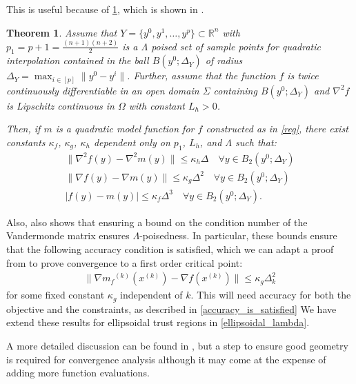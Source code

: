 \documentclass{article}
\newtheorem{theorem}{Theorem}[section]
\theoremstyle{case}
\numberwithin{theorem}{subsection}
\newcommand{\dk}{\Delta_k}
\newcommand{\gradf}{\nabla f}
\newcommand{\mfk}{{{m}_f}^{(k)}}
\newcommand{\Rn}{\mathbb R^n}
\newcommand{\xk}{x^{(k)}}
\begin{document}
This is useful because of \cref{quadratic_errors}, which is shown in \cite{introduction_book}.

\begin{theorem}
\label{quadratic_errors}
Assume that $Y = \{y^0, y^1, \ldots, y^p\} \subset \Rn$ with $p_1 = p+1= \frac{(n+1)(n+2)}{2}$ is a $\Lambda$
poised set of sample points for quadratic interpolation contained in the ball $B(y^0; \Delta_Y)$ of radius $\Delta_Y = \max_{i \in [p]} \|y^0 - y^i\|$.
Further, assume that the function $f$ is twice continuously differentiable in an open domain $\Sigma$ containing $B(y^0; \Delta_Y)$ and $\nabla^2 f$
is Lipschitz continuous in $\Omega$ with constant $L_h > 0$.

Then, if $m$ is a quadratic model function for $f$ constructed as in \cref{reg}, there exist constants $\kappa_f$, $\kappa_g$, $\kappa_h$ dependent only on $p_1$, $L_h$, and $\Lambda$ such that:
\begin{align}
\|\nabla^2 f(y) - \nabla^2 m(y)\| \le \kappa_{h} \Delta \quad \forall y \in B_2(y^0; \Delta_Y) \label{error_in_hessian}\\
\|\gradf(y) - \nabla m(y)\| \le \kappa_{g} \Delta^2 \quad \forall y \in B_2(y^0; \Delta_Y) \label{error_in_gradient} \\
|f(y) - m(y) | \le \kappa_{f} \Delta^3 \quad \forall y \in B_2(y^0; \Delta_Y). \label{error_in_function} 
\end{align}
\end{theorem}


Also, \cite{introduction_book} also shows that ensuring a bound on the condition number of the Vandermonde matrix ensures $\Lambda$-poisedness.
In particular, these bounds ensure that the following accuracy condition is satisfied, which we can adapt a proof from \cite{Conejo:2013:GCT:2620806.2621814} to prove convergence to a first order critical point: 
\begin{align}
\label{accuracy}
\|\nabla \mfk(\xk) - \gradf(\xk) \| \le \kappa_g \dk^2
\end{align}
for some fixed constant $\kappa_g$ independent of $k$.
This will need accuracy for both the objective and the constraints, as described in \cref{accuracy_is_satisfied}
We have extend these results for ellipsoidal trust regions in \cref{ellipsoidal_lambda}.
 
A more detailed discussion can be found in \cite{doi:10.1080/10556780802409296}, but a step to ensure good geometry is required for convergence analysis although it may come at the expense of adding more function evaluations.
\end{document}
